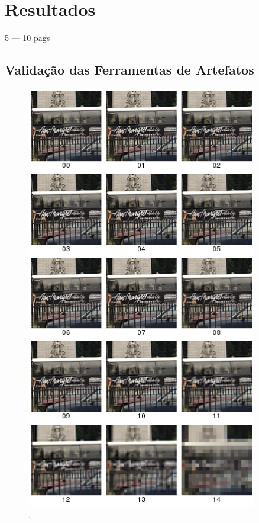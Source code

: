 
\chapter{Resultados}
5 --- 10 pags

\section{Validação das Ferramentas de Artefatos}

\begin{figure}[!htb]
	\centering
	\includegraphics[width=0.9\textwidth]{./imgs/blockbus.png}
	\caption{.}
	\label{fig:blockbus}
\end{figure}

